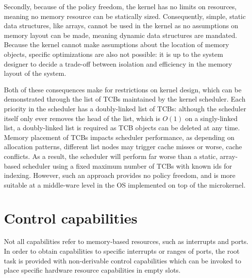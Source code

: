 Secondly, because of the policy freedom, the kernel has no limits on resources, meaning no memory
resource can be statically sized. Consequently, simple, static data structures, like arrays, cannot
be used in the kernel as no assumptions on memory layout can be made, meaning dynamic data
structures are mandated. Because the kernel cannot make assumptions about the location of memory
objects, specific optimizations are also not possible: it is up to the system designer to decide a trade-off
between isolation and efficiency in the memory layout of the system.

Both of these consequences make for restrictions on kernel design, which can be demonstrated through
the list of TCBs maintained by the kernel scheduler. Each priority in the scheduler has a
doubly-linked list of TCBs: although the scheduler itself only ever removes the head of the list,
which is $O(1)$ on a singly-linked list, a doubly-linked list is required as TCB objects can be
deleted at any time. Memory placement of TCBs impacts scheduler performance, as depending on
allocation patterns, different list nodes may trigger cache misses or worse, cache conflicts. As a
result, the scheduler will perform far worse than a static, array-based scheduler using a fixed
maximum number of TCBs with known ids for indexing. However, such an approach provides no policy
freedom, and is more suitable at a middle-ware level in the \gls{OS} implemented on top of the
microkernel. 

\section{Control capabilities}
\label{s:control-capabilities}

Not all capabilities refer to memory-based resources, such as interrupts and \IO ports.
In order to obtain capabilities to specific interrupts or ranges of \IO ports, the root task is
provided with non-derivable control capabilities which can be invoked to place specific hardware
resource capabilities in empty slots.

